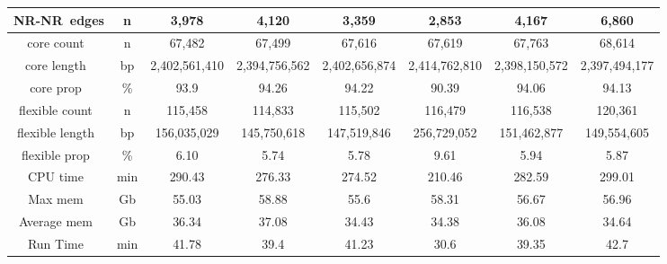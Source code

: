 \documentclass[../main.tex]{subfiles}
\begin{document}
\begin{flushleft}
\begin{center}
\begin{tabular}{|c|c|c|c|c|c|c|c|}
    \hline
    NR-NR~edges                 & n                     & 3,978         & 4,120         & 3,359         & 2,853         & 4,167         & 6,860          \\
    \hline
    core count~                 & n                     & 67,482        & 67,499        & 67,616        & 67,619        & 67,763        & 68,614         \\
    \hline
    core length~                & bp                    & 2,402,561,410 & 2,394,756,562 & 2,402,656,874 & 2,414,762,810 & 2,398,150,572 & 2,397,494,177  \\
    \hline
    core prop~                  & \%                    & 93.9          & 94.26         & 94.22         & 90.39         & 94.06         & 94.13          \\
    \hline
    flexible count~             & n                     & 115,458       & 114,833       & 115,502       & 116,479       & 116,538       & 120,361        \\
    \hline
    flexible length~            & bp                    & 156,035,029   & 145,750,618   & 147,519,846   & 256,729,052   & 151,462,877   & 149,554,605    \\
    \hline
    flexible prop~              & \%                    & 6.10          & 5.74          & 5.78          & 9.61          & 5.94          & 5.87           \\
    \hline
    CPU time~                   & min                   & 290.43        & 276.33        & 274.52        & 210.46        & 282.59        & 299.01         \\
    \hline
    Max mem~                    & Gb                    & 55.03         & 58.88         & 55.6          & 58.31         & 56.67         & 56.96          \\
    \hline
    Average mem~                & Gb                    & 36.34         & 37.08         & 34.43         & 34.38         & 36.08         & 34.64          \\
    \hline
    Run Time~                   & min                   & 41.78         & 39.4          & 41.23         & 30.6          & 39.35         & 42.7           \\
    \hline
    \end{tabular}
\end{center}

\bigskip
\normalsize


\end{flushleft}
\end{document}
